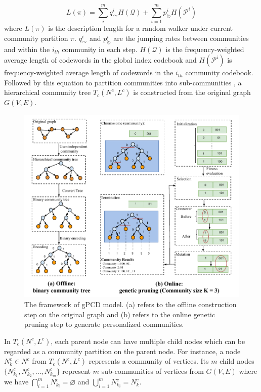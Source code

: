 \begin{equation} 
\textit{$L(\pi)$} = \sum_{i}^{m}q_{\curvearrowright}^{i}H(\mathcal{Q})+\sum_{i=1}^{m} \textit{$p_{\circlearrowright}^{i}$}H(\textit{$\mathcal{P}^{i}$}) 
\end{equation}
where \textit{$L(\pi)$} is the description length for a random walker under current community partition $\pi$. $q_{\curvearrowright}^{i}$ and $p_{\circlearrowright}^{i}$ are the jumping rates between communities and within the $i_{th}$ community in each step. $H(\mathcal{Q})$ is the frequency-weighted average length of codewords in the global index codebook and $H(\mathcal{P}^{i})$ is frequency-weighted average length of codewords in the $i_{th}$ community codebook. Followed by this equation to partition communities into sub-communities , a hierarchical community tree \textit{$T_{c}(N^{c},L^{c})$} is constructed from the original graph $G(V,E)$. 
\begin{figure}  
	\center
	\includegraphics[width=1.0\columnwidth]{img/chapter3/4.pdf}
	\caption{The framework of gPCD model. (a) refers to the offline construction step on the original graph and (b) refers to the online genetic pruning step to generate personalized communities.} 
	\label{fig:pipeline}
\end{figure}
In \textit{$T_{c}(N^{c},L^{c})$}, each parent node can have multiple child nodes which can be regarded as a community partition on the parent node. For instance, a node $N_{k}^{c} \in N^{c}$ from $T_{c}(N^{c},L^{c})$ represents a community of vertices.  Its $m$ child nodes $\{N_{k_{1}}^{c},N_{k_{2}}^{c},...,N_{k_{m}}^{c}\}$ represent $m$ sub-communities of vertices from $G(V,E)$ where we have $	\bigcap_{i=1}^{m} N_{k_{i}}^{c} = \varnothing$ and  $	\bigcup_{i=1}^{m} N_{k_{i}}^{c} =  N_{k}^{c}$.  



